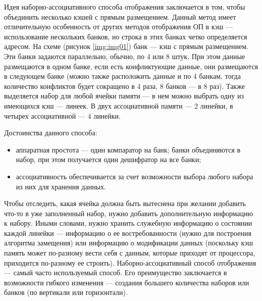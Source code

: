 Идея наборно-ассоциативного способа отображения заключается в том, чтобы
объединить несколько кэшей с прямым размещением.  Данный метод имеет
отличительную особенность от других методов отображения ОП в кэш ---
использование нескольких банков, но строка в этих банках четко определяется
адресом. На схеме (рисунок \ref{img:img01}) банк --- кэш с прямым размещением.
Эти банки задаются параллельно, обычно, по 4 или 8 штук. При этом данные
размещаются в одном банке, если есть конфликтующие данные, они размещаются в
следующем банке (можно также расположить данные и по 4 банкам, тогда количество
конфликтов будет сокращено в 4 раза, 8 банков --- в 8 раз).  Также выделяется
набор для любой ячейки памяти --- в нем можно выбрать одну из имеющихся
кэш --- линеек. В двух ассоциативной памяти --- 2 линейки, в четырех
ассоциативной --- 4 линейки.


Достоинства данного способа:
\begin{itemize}[left=\parindent]
    \item аппаратная простота --- один компаратор на банк; банки объединяются в
        набор, при этом получается один дешифратор на все банки;
    \item ассоциативность обеспечивается за счет возможности выбора любого
        набора из них для хранения данных. 
\end{itemize}

Чтобы отследить, какая ячейка должна быть вытеснена при желании добавить что-то
в уже заполненный набор, нужно добавить дополнительную информацию к набору.
Иными словами, нужно хранить служебную информацию о состоянии каждой линейки
--- информацию о ее востребованности (нужно для построения алгоритма замещения)
или информацию о модификации данных (поскольку кэш память может по-разному
вести себя с данным, которые приходят от процессора, приходится по-разному ее
строить).  Наборно-ассоциативный способ отображения --- самый часто
используемый способ. Его преимущество заключается в возможности гибкого
изменения --- создания большего количества наборов или банков (по вертикали или
горизонтали).
